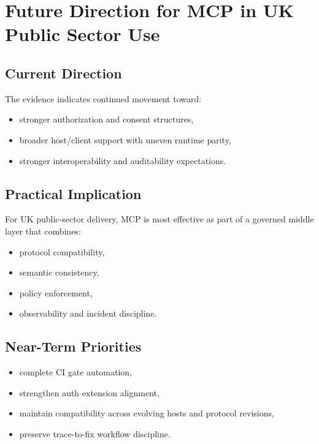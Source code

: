 \chapter{Future Direction for MCP in UK Public Sector Use}
\label{ch:future}

\section{Current Direction}

The evidence indicates continued movement toward:
\begin{itemize}
  \item stronger authorization and consent structures,
  \item broader host/client support with uneven runtime parity,
  \item stronger interoperability and auditability expectations.
\end{itemize}

\section{Practical Implication}

For UK public-sector delivery, MCP is most effective as part of a governed
middle layer that combines:
\begin{itemize}
  \item protocol compatibility,
  \item semantic consistency,
  \item policy enforcement,
  \item observability and incident discipline.
\end{itemize}

\section{Near-Term Priorities}

\begin{itemize}
  \item complete CI gate automation,
  \item strengthen auth extension alignment,
  \item maintain compatibility across evolving hosts and protocol revisions,
  \item preserve trace-to-fix workflow discipline.
\end{itemize}
